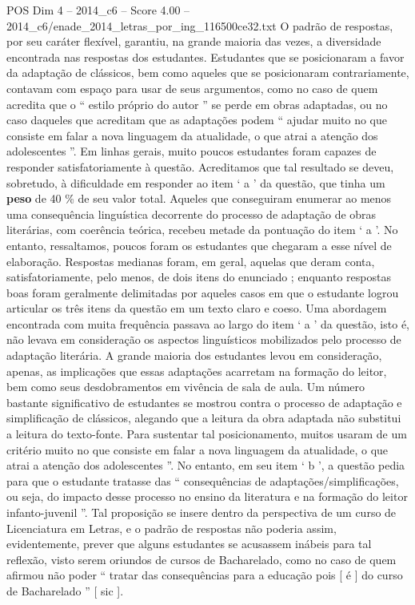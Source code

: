 \begin{textsample}{POS Dim 4 – 2014\_c6 – Score 4.00 – 2014\_c6/enade\_2014\_letras\_por\_ing\_116500ce32.txt}
O padrão de respostas, por seu caráter flexível, garantiu, na grande maioria das vezes, a diversidade encontrada nas respostas dos estudantes.
Estudantes que se posicionaram a favor da adaptação de clássicos, bem como aqueles que se posicionaram contrariamente, contavam com espaço para usar de seus argumentos, como no caso de quem acredita que o “ estilo próprio do autor ” se perde em obras adaptadas, ou no caso daqueles que acreditam que as adaptações podem “ ajudar muito no que consiste em falar a nova linguagem da atualidade, o que atrai a atenção dos adolescentes ”.
Em linhas gerais, muito poucos estudantes foram capazes de responder satisfatoriamente à questão.
Acreditamos que tal resultado se deveu, sobretudo, à dificuldade em responder ao item ‘ a ’ da questão, que tinha um \textbf{peso} de 40 \% de seu valor total.
Aqueles que conseguiram enumerar ao menos uma consequência linguística decorrente do processo de adaptação de obras literárias, com coerência teórica, recebeu metade da pontuação do item ‘ a ’.
No entanto, ressaltamos, poucos foram os estudantes que chegaram a esse nível de elaboração.
Respostas medianas foram, em geral, aquelas que deram conta, satisfatoriamente, pelo menos, de dois itens do enunciado ; enquanto respostas boas foram geralmente delimitadas por aqueles casos em que o estudante logrou articular os três itens da questão em um texto claro e coeso.
Uma abordagem encontrada com muita frequência passava ao largo do item ‘ a ’ da questão, isto é, não levava em consideração os aspectos linguísticos mobilizados pelo processo de adaptação literária.
A grande maioria dos estudantes levou em consideração, apenas, as implicações que essas adaptações acarretam na formação do leitor, bem como seus desdobramentos em vivência de sala de aula.
Um número bastante significativo de estudantes se mostrou contra o processo de adaptação e simplificação de clássicos, alegando que a leitura da obra adaptada não substitui a leitura do texto-fonte.
Para sustentar tal posicionamento, muitos usaram de um critério muito no que consiste em falar a nova linguagem da atualidade, o que atrai a atenção dos adolescentes ”.
No entanto, em seu item ‘ b ’, a questão pedia para que o estudante tratasse das “ consequências de adaptações/simplificações, ou seja, do impacto desse processo no ensino da literatura e na formação do leitor infanto-juvenil ”.
Tal proposição se insere dentro da perspectiva de um curso de Licenciatura em Letras, e o padrão de respostas não poderia assim, evidentemente, prever que alguns estudantes se acusassem inábeis para tal reflexão, visto serem oriundos de cursos de Bacharelado, como no caso de quem afirmou não poder “ tratar das consequências para a educação pois [ é ] do curso de Bacharelado ” [ sic ].

\end{textsample}
